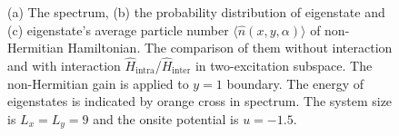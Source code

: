 \documentclass[longbibliography, aps, prx, amsmath, amssymb, amsfonts, twocolumn,superscriptaddress, footinbib]{revtex4-1}
\begin{document}
\begin{figure}[htbp]
		\caption{%
		(a) The spectrum, (b) the probability distribution of eigenstate and (c) eigenstate's average particle number $\langle \hat{n}(x,y,\alpha) \rangle$ of non-Hermitian Hamiltonian. The comparison of them without interaction and with interaction  $\hat{H}_{\text{intra}}$/$\hat{H}_{\text{inter}}$ in two-excitation subspace. The non-Hermitian gain is applied to $y=1$ boundary. The energy of eigenstates is indicated by orange cross in spectrum. 
		The system size is $L_x=L_y=9$ and the onsite potential is $u=-1.5$. 
		}
		\label{fig:02}
	\end{figure}
\end{document}
